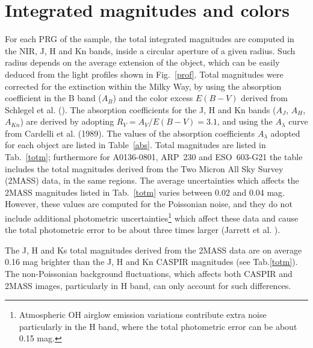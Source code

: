 \documentclass{aa}
\begin{document}
\section{Integrated magnitudes and colors}\label{color}

For each PRG of the sample, the total integrated magnitudes are computed 
in the NIR, J, H and Kn bands, inside a circular aperture of a given radius. 
Such radius depends on the average extension of the object, which can be 
easily deduced from the light profiles shown in Fig.~\ref{prof}.
Total magnitudes were corrected for the extinction within
the Milky Way, by using the absorption coefficient in the B band 
($A_B$) and the color excess $E(B-V)$ derived from Schlegel et
al. (\cite{Schlegel98}).
The absorption coefficients for the J, H and Kn bands ($A_J$, $A_H$, $A_{Kn}$) 
are derived by adopting $R_V=A_V/E(B-V)=3.1$, and using the $A_\lambda$
curve from Cardelli et al. (1989). 
The values of the absorption coefficients $A_\lambda$ adopted for each object 
are listed in Table~\ref{abs}.
Total magnitudes are listed in Tab.~\ref{totm}; furthermore for A0136-0801, 
ARP~230 and ESO~603-G21 the table includes the total magnitudes derived from the 
Two Micron All Sky Survey (2MASS) data, in the same regions.
The average uncertainties which affects the 2MASS magnitudes listed in 
Tab.~\ref{totm} varies between 0.02 and 0.04 mag. However, these values
are computed for the Poissonian noise, and they do not include 
additional photometric uncertainties\footnote{Atmospheric OH airglow emission
variations contribute extra noise particularly in the H band, where
the total photometric error can be about 0.15 mag.} 
which affect these data and cause the total photometric error to be about three
times larger (Jarrett et al. \cite{2mass}). 

The J, H and Ks total magnitudes derived from the 2MASS data
are on average 0.16 mag brighter than the J, H and Kn CASPIR 
magnitudes (see Tab.\ref{totm}). 
The non-Poissonian background fluctuations, which affects both CASPIR
and 2MASS images, particularly in H band, can only account for such differences.
\end{document}
